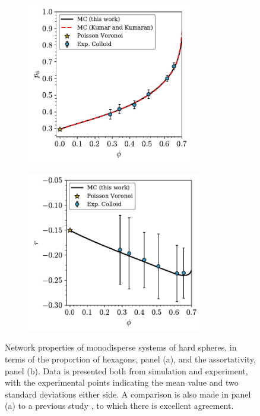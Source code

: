 \begin{figure}[bt]
     \centering
     
      \begin{subfigure}[b]{0.45\textwidth}
         \centering
         \includegraphics[height=7cm]{./figures/quasi2d/mono_phi_p6.pdf}
         \caption{}
         \label{fig:mono1}
     \end{subfigure}
     \hfill
       \begin{subfigure}[b]{0.45\textwidth}
         \centering
         \includegraphics[height=7cm]{./figures/quasi2d/mono_phi_r.pdf}
         \caption{}
         \label{fig:mono2}
     \end{subfigure}
     \hfill
    
     \caption{Network properties of monodisperse systems of \qtd{} hard spheres, in terms of the proportion of hexagons, panel (a), and the assortativity, panel (b). Data is presented both from simulation and experiment, with the experimental points indicating the mean value and two standard deviations either side. A comparison is also made in panel (a) to a previous study \cite{Kumar2005}, to which there is excellent agreement.}
     \label{fig:mono}
\end{figure}


